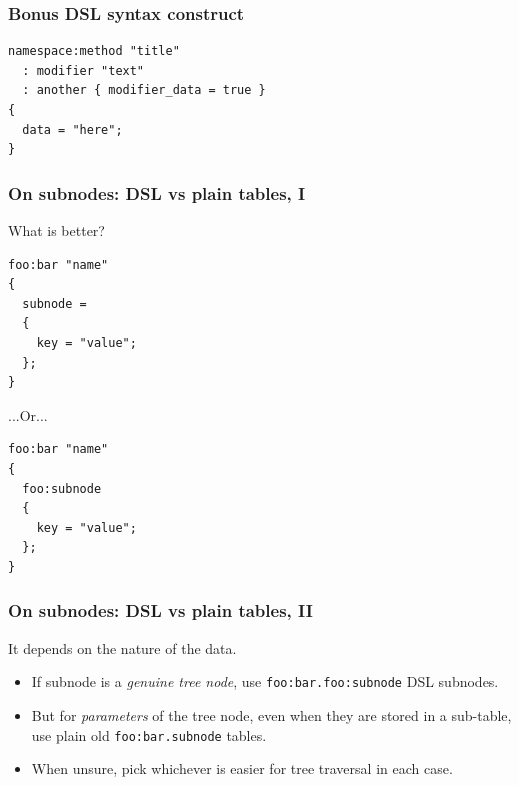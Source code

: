\documentclass[handout]{beamer}
\begin{document}

\begin{frame}[fragile]

\frametitle{Bonus DSL syntax construct}

\begin{verbatim}
namespace:method "title"
  : modifier "text"
  : another { modifier_data = true }
{
  data = "here";
}
\end{verbatim}

\end{frame}


\begin{frame}[fragile]

\frametitle{On subnodes: DSL vs plain tables, I}

What is better?

\begin{verbatim}
foo:bar "name"
{
  subnode =
  {
    key = "value";
  };
}
\end{verbatim}

...Or...

\begin{verbatim}
foo:bar "name"
{
  foo:subnode
  {
    key = "value";
  };
}
\end{verbatim}

\end{frame}


\begin{frame}[fragile]

\frametitle{On subnodes: DSL vs plain tables, II}

It depends on the nature of the data.
\pause

\begin{itemize}
\item If subnode is a \emph{genuine tree node},
      use \verb|foo:bar.foo:subnode| DSL subnodes.
\pause
\item But for \emph{parameters} of the tree node,
      even when they are stored in a sub-table,
      use plain old \verb|foo:bar.subnode| tables.
\pause
\item When unsure, pick whichever is easier for tree traversal
      in each case.
\end{itemize}

\end{frame}
\end{document}
